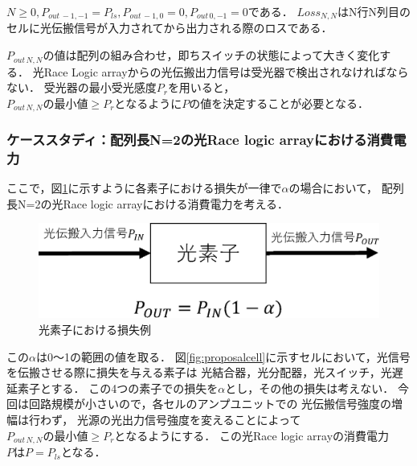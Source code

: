 $N \geq 0,P_{out\,-1,-1}=P_{ls},P_{out\,-1,0}=0,P_{out\,0,-1}=0である．$
$Loss_{N,N}$はN行N列目のセルに光伝搬信号が入力されてから出力される際のロスである．

$P_{out\,N,N}$の値は配列の組み合わせ，即ちスイッチの状態によって大きく変化する．
光Race Logic arrayからの光伝搬出力信号は受光器で検出されなければならない．
受光器の最小受光感度$P_{r}$を用いると，
$P_{out\,N,N}の最小値 \geq P_{r}となるようにP$の値を決定することが必要となる．

\subsubsection{ケーススタディ：配列長N=2の光Race logic arrayにおける消費電力}
ここで，図\ref{fig:loss}に示すように各素子における損失が一律で$\alpha$の場合において，
配列長N=2の光Race logic arrayにおける消費電力を考える．
\begin{figure}[t!]
\begin{center}
\includegraphics[keepaspectratio,scale=0.5]{fig/4/loss.eps}
\caption{光素子における損失例}
\label{fig:loss}
\end{center}
\end{figure}
この$\alpha$は0〜1の範囲の値を取る．
図\ref{fig:proposalcell}に示すセルにおいて，光信号を伝搬させる際に損失を与える素子は
光結合器，光分配器，光スイッチ，光遅延素子とする．
この4つの素子での損失を$\alpha$とし，その他の損失は考えない．
今回は回路規模が小さいので，各セルのアンプユニットでの
光伝搬信号強度の増幅は行わず，
光源の光出力信号強度を変えることによって$P_{out\,N,N}の最小値 \geq P_{r}となるように$する．
この光Race logic arrayの消費電力$PはP=P_{ls}$となる．

